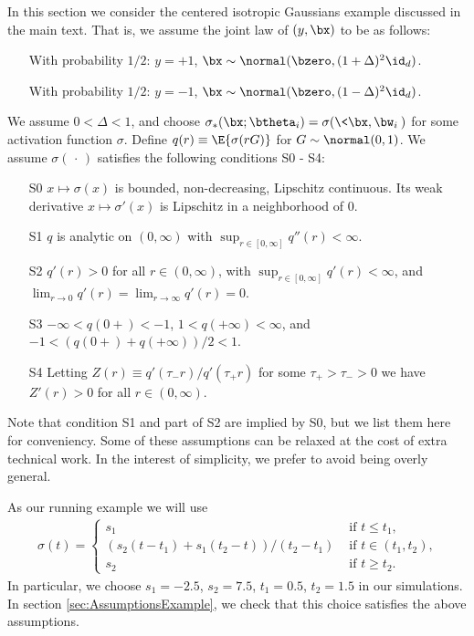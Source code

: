 \documentclass[11pt]{article}
\begin{document}
In this section we consider the centered isotropic Gaussians example discussed in the main text. That is, we assume the joint law of $(y,\bx)$ to be as follows:
%
\begin{itemize}
%
\item[] With probability $1/2$: $y=+1$, $\bx\sim\normal(\bzero, (1 + \Delta)^2 \id_d)$.
%
\item[] With probability $1/2$: $y=-1$, $\bx\sim\normal(\bzero, (1 - \Delta)^2 \id_d)$.
%
\end{itemize}
We assume $0 < \Delta < 1$, and choose $\sigma_*(\bx;\btheta_i) = \sigma(\<\bx,\bw_i\>)$ for some activation function $\sigma$. Define $q(r) \equiv \E\{\sigma(rG)\}$ for $G\sim\normal(0,1)$. We assume $\sigma(\,\cdot \,)$ satisfies the following conditions {\sf S0} - {\sf S4}: 
\begin{itemize}
%
\item[{\sf S0}] $x\mapsto \sigma(x)$ is bounded, non-decreasing, Lipschitz continuous.
Its weak derivative $x \mapsto \sigma'(x)$ is  Lipschitz in a neighborhood of $0$. 
\item[{\sf S1}] $q$ is analytic on $(0, \infty)$ with  $\sup_{r\in[0,\infty]} q''(r)<\infty$.%
\item[{\sf S2}] $q'(r)>0$ for all $r\in (0,\infty)$, with $\sup_{r\in[0,\infty]} q'(r)<\infty$, and  $\lim_{r\to 0} q'(r) = \lim_{r\to\infty}q'(r) = 0$.
\item[{\sf S3}] $-\infty < q(0+)<-1$, $1 < q(+\infty) <\infty$, and $-1 < (q(0+) + q(+ \infty))/2 < 1$.
\item[{\sf S4}] Letting $Z(r) \equiv q'(\tau_- r)/q'(\tau_+ r)$ for some $\tau_+ > \tau_- > 0$ we have $Z'(r) >0$ for all $r\in (0,\infty)$. 
%
\end{itemize}

Note that condition {\sf S1} and part of {\sf S2} are implied by {\sf S0}, but we list them here for conveniency. Some of these assumptions can be relaxed at 
the cost of extra technical work. In the interest of simplicity, we prefer to 
avoid being overly general. 

As our running example we will use
%
\begin{align}
%
\sigma(t) = 
\begin{cases} 
s_1 & \mbox{ if $t\le t_1$,}\\
(s_2(t-t_1)+s_1(t_2-t))/(t_2-t_1) & \mbox{ if $t\in(t_1,t_2)$,}\\
s_2 & \mbox{ if $t\ge t_2$.}
\end{cases}\label{eq:SimpleSigma}
%
\end{align}
%
In particular, we choose $s_1 = -2.5$, $s_2 = 7.5$, $t_1 = 0.5$, $t_2 = 1.5$ in our simulations. In section \ref{sec:AssumptionsExample}, we check that this choice satisfies the above assumptions. 
\end{document}
